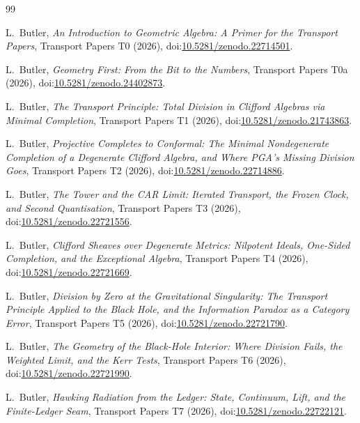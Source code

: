 \documentclass[11pt]{article}
\theoremstyle{definition}
\begin{document}
\begin{thebibliography}{99}

L.~Butler,
\emph{An Introduction to Geometric Algebra: A Primer for the Transport Papers},
Transport Papers T0 (2026), doi:\href{https://doi.org/10.5281/zenodo.22714501}{10.5281/zenodo.22714501}.

L.~Butler,
\emph{Geometry First: From the Bit to the Numbers},
Transport Papers T0a (2026), doi:\href{https://doi.org/10.5281/zenodo.24402873}{10.5281/zenodo.24402873}.

L.~Butler,
\emph{The Transport Principle: Total Division in Clifford Algebras via Minimal Completion},
Transport Papers T1 (2026), doi:\href{https://doi.org/10.5281/zenodo.21743863}{10.5281/zenodo.21743863}.

L.~Butler,
\emph{Projective Completes to Conformal: The Minimal Nondegenerate Completion of a Degenerate Clifford Algebra, and Where PGA's Missing Division Goes},
Transport Papers T2 (2026), doi:\href{https://doi.org/10.5281/zenodo.22714886}{10.5281/zenodo.22714886}.

L.~Butler,
\emph{The Tower and the CAR Limit: Iterated Transport, the Frozen Clock, and Second Quantisation},
Transport Papers T3 (2026), doi:\href{https://doi.org/10.5281/zenodo.22721556}{10.5281/zenodo.22721556}.

L.~Butler,
\emph{Clifford Sheaves over Degenerate Metrics: Nilpotent Ideals, One-Sided Completion, and the Exceptional Algebra},
Transport Papers T4 (2026), doi:\href{https://doi.org/10.5281/zenodo.22721669}{10.5281/zenodo.22721669}.

L.~Butler,
\emph{Division by Zero at the Gravitational Singularity: The Transport Principle Applied to the Black Hole, and the Information Paradox as a Category Error},
Transport Papers T5 (2026), doi:\href{https://doi.org/10.5281/zenodo.22721790}{10.5281/zenodo.22721790}.

L.~Butler,
\emph{The Geometry of the Black-Hole Interior: Where Division Fails, the Weighted Limit, and the Kerr Tests},
Transport Papers T6 (2026), doi:\href{https://doi.org/10.5281/zenodo.22721990}{10.5281/zenodo.22721990}.

L.~Butler,
\emph{Hawking Radiation from the Ledger: State, Continuum, Lift, and the Finite-Ledger Seam},
Transport Papers T7 (2026), doi:\href{https://doi.org/10.5281/zenodo.22722121}{10.5281/zenodo.22722121}.


\end{thebibliography}
\end{document}
